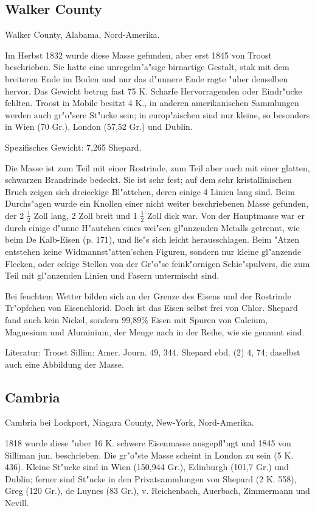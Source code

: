 \documentclass[a4paper, 11pt, oneside]{article}
\begin{document}
\subsection{Walker County}

Walker County, Alabama, Nord-Amerika.

Im Herbst 1832 wurde diese Masse gefunden, aber erst 1845 von Troost beschrieben. Sie hatte eine unregelm"a"sige birnartige Gestalt, stak mit dem breiteren Ende im Boden und nur das d"unnere Ende ragte "uber denselben hervor. Das Gewicht betrug fast 75 K. Scharfe Hervorragenden oder Eindr"ucke fehlten. Troost in Mobile besitzt 4 K., in anderen amerikanischen Sammlungen werden auch gr"o"sere St"ucke sein; in europ"aischen sind nur kleine, so besonders in Wien (70 Gr.), London (57,52 Gr.) und Dublin.

Spezifisches Gewicht: 7,265 Shepard.

Die Masse ist zum Teil mit einer Rostrinde, zum Teil aber auch mit einer glatten, schwarzen Brandrinde bedeckt. Sie ist sehr fest; auf dem sehr kristallinischen Bruch zeigen sich dreieckige Bl"attchen, deren einige 4 Linien lang sind. Beim Durchs"agen wurde ein Knollen einer nicht weiter beschriebenen Masse gefunden, der 2 $\frac{1}{2}$ Zoll lang, 2 Zoll breit und 1 $\frac{1}{2}$ Zoll dick war. Von der Hauptmasse war er durch einige d"unne H"autchen eines wei"sen gl"anzenden Metalls getrennt, wie beim De Kalb-Eisen (p. 171), und lie"s sich leicht herausschlagen. Beim "Atzen entstehen keine Widmannst"atten'schen Figuren, sondern nur kleine gl"anzende Flecken, oder eckige Stellen von der Gr"o"se feink"ornigen Schie"spulvers, die zum Teil mit gl"anzenden Linien und Fasern untermischt sind.

Bei feuchtem Wetter bilden sich an der Grenze des Eisens und der Rostrinde Tr"opfchen von Eisenchlorid. Doch ist das Eisen selbst frei von Chlor. Shepard fand auch kein Nickel, sondern 99,89\% Eisen mit Spuren von Calcium, Magnesium und Aluminium, der Menge nach in der Reihe, wie sie genannt sind.

Literatur: Troost Sillim: Amer. Journ. 49, 344. Shepard ebd. (2) 4, 74; daselbst auch eine Abbildung der Masse.

\subsection{Cambria}

Cambria bei Lockport, Niagara County, New-York, Nord-Amerika.

1818 wurde diese "uber 16 K. schwere Eisenmasse ausgepfl"ugt und 1845 von Silliman jun. beschrieben. Die gr"o"ste Masse scheint in London zu sein (5 K. 436). Kleine St"ucke sind in Wien (150,944 Gr.), Edinburgh (101,7 Gr.) und Dublin; ferner sind St"ucke in den Privatsammlungen von Shepard (2 K. 558), Greg (120 Gr.), de Luynes (83 Gr.), v. Reichenbach, Auerbach, Zimmermann und Nevill.
\end{document}
